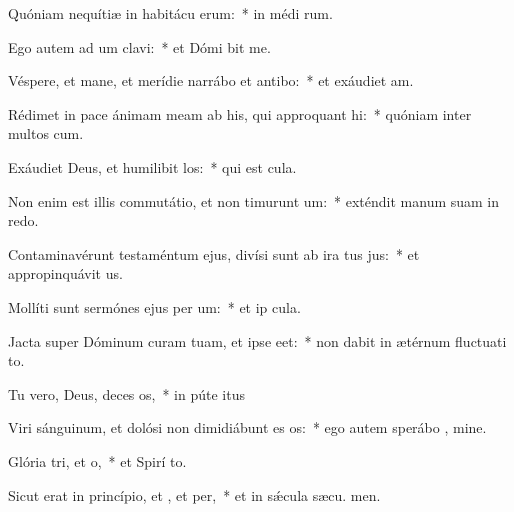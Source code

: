 \item Quóniam nequítiæ in habitácu erum:~* in médi rum.
\item Ego autem ad um clavi:~* et Dómi bit me.
\item Véspere, et mane, et merídie narrábo et antibo:~* et exáudiet  am.
\item Rédimet in pace ánimam meam ab his, qui approquant hi:~* quóniam inter multos  cum.
\item Exáudiet Deus, et humilibit los:~* qui est  cula.
\item Non enim est illis commutátio, et non timurunt um:~* exténdit manum suam in redo.
\item Contaminavérunt testaméntum ejus, divísi sunt ab ira tus jus:~* et appropinquávit  us.
\item Mollíti sunt sermónes ejus per um:~* et ip  cula.
\item Jacta super Dóminum curam tuam, et ipse  eet:~* non dabit in ætérnum fluctuati to.
\item Tu vero, Deus, deces os,~* in púte itus
\item Viri sánguinum, et dolósi non dimidiábunt es os:~* ego autem sperábo  , mine.
\item Glória tri, et o,~* et Spirí to.
\item Sicut erat in princípio, et , et per,~* et in sǽcula sæcu. men.
